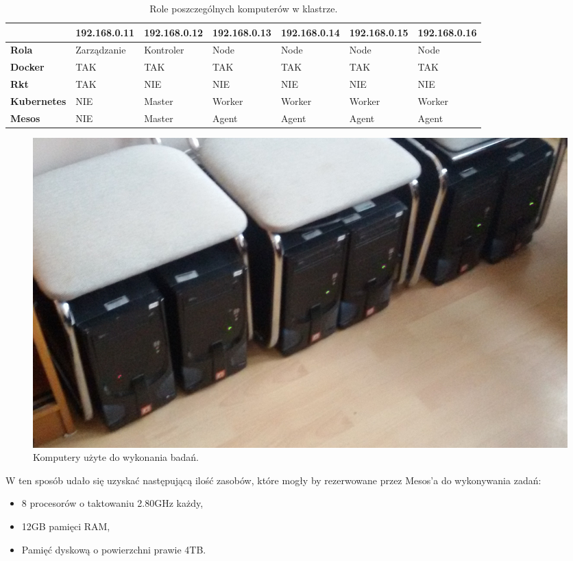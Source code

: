 \documentclass[10pt,a4paper,titlepage,twoside]{report}
\begin{document}
\begin{table}[!h]
\caption{Role poszczególnych komputerów w klastrze.}
\label{klaster_magisterski}
\centering
\begin{tabular}{|p{2cm}|p{2cm}|p{2cm}|p{2cm}|p{2cm}|p{2cm}|p{2cm}|}
  \hline
   & 192.168.0.11 & 192.168.0.12 & 192.168.0.13 & 192.168.0.14 & 192.168.0.15 & 192.168.0.16 \\
  \hline
  \textbf{Rola} & Zarządzanie & Kontroler & Node & Node & Node & Node \\
  \hline
  \textbf{Docker} & TAK & TAK & TAK & TAK & TAK & TAK \\
  \hline
  \textbf{Rkt} & TAK & NIE & NIE & NIE & NIE & NIE \\
  \hline
  \textbf{Kubernetes} & NIE & Master & Worker & Worker & Worker & Worker \\
  \hline
  \textbf{Mesos} & NIE & Master & Agent & Agent & Agent & Agent \\
  \hline
\end{tabular}
\end{table}

\begin{figure}[!h]
	\centering
	\includegraphics[scale=0.15]{pics/20170308_163141.jpg}
	\caption{Komputery użyte do wykonania badań.}
	\label{klaster_magisterski_photo}
\end{figure}

W ten sposób udało się uzyskać następującą ilość zasobów, które mogły by rezerwowane przez Mesos'a do wykonywania zadań:
\begin{itemize}
\item 8 procesorów o taktowaniu 2.80GHz każdy,
\item 12GB pamięci RAM,
\item Pamięć dyskową o powierzchni prawie 4TB.
\end{itemize}
\end{document}

